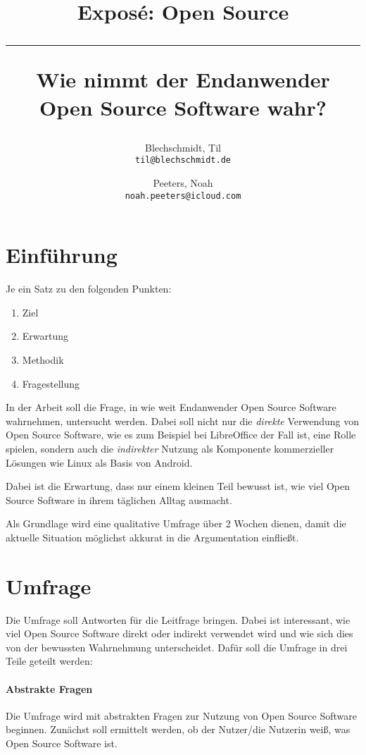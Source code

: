 \documentclass[a4paper]{article}
\title{Exposé: Open Source \\
    \noindent\rule[0.25ex]{\linewidth}{0.5pt}
    \large Wie nimmt der Endanwender Open Source Software wahr?
}
\author{
  Blechschmidt, Til\\
  \texttt{til@blechschmidt.de}
  \and
  Peeters, Noah\\
  \texttt{noah.peeters@icloud.com}
}
\begin{document}
	\thispagestyle{fancy}
	\maketitle
	\clearpage
	
	\section{Einführung}
	   Je ein Satz zu den folgenden Punkten:
	   \begin{enumerate}
	       \item Ziel
	       \item Erwartung
	       \item Methodik
	       \item Fragestellung
	   \end{enumerate}
	
	   In der Arbeit soll die Frage, in wie weit Endanwender Open Source Software wahrnehmen, untersucht werden. Dabei soll nicht nur die \emph{direkte} Verwendung von Open Source Software, wie es zum Beispiel bei LibreOffice der Fall ist, eine Rolle spielen, sondern auch die \emph{indirekter} Nutzung als Komponente kommerzieller Lösungen wie Linux als Basis von Android.
	   
	   Dabei ist die Erwartung, dass nur einem kleinen Teil bewusst ist, wie viel Open Source Software in ihrem täglichen Alltag ausmacht.
	   
	   Als Grundlage wird eine qualitative Umfrage über 2 Wochen dienen, damit die aktuelle Situation möglichst akkurat in die Argumentation einfließt.
	   
	\clearpage
	
	\section{Umfrage}
	   Die Umfrage soll Antworten für die Leitfrage bringen. Dabei ist interessant, wie viel Open Source Software direkt oder indirekt verwendet wird und wie sich dies von der bewussten Wahrnehmung unterscheidet. Dafür soll die Umfrage in drei Teile geteilt werden:
	   
	   \paragraph{Abstrakte Fragen}
	       Die Umfrage wird mit abstrakten Fragen zur Nutzung von Open Source Software beginnen. Zunächst soll ermittelt werden, ob der Nutzer/die Nutzerin weiß, was Open Source Software ist.
	       
\end{document}
